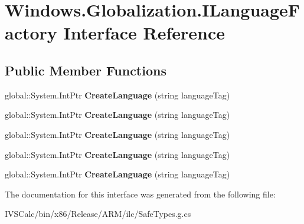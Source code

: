 \hypertarget{interface_windows_1_1_globalization_1_1_i_language_factory}{}\section{Windows.\+Globalization.\+I\+Language\+Factory Interface Reference}
\label{interface_windows_1_1_globalization_1_1_i_language_factory}
\subsection*{Public Member Functions}
\begin{DoxyCompactItemize}
\item 
\mbox{\label{interface_windows_1_1_globalization_1_1_i_language_factory_a6bab804d6e5bec1e8de8706976b6d11e}} 
global\+::\+System.\+Int\+Ptr {\bfseries Create\+Language} (string language\+Tag)
\item 
\mbox{\label{interface_windows_1_1_globalization_1_1_i_language_factory_a6bab804d6e5bec1e8de8706976b6d11e}} 
global\+::\+System.\+Int\+Ptr {\bfseries Create\+Language} (string language\+Tag)
\item 
\mbox{\label{interface_windows_1_1_globalization_1_1_i_language_factory_a6bab804d6e5bec1e8de8706976b6d11e}} 
global\+::\+System.\+Int\+Ptr {\bfseries Create\+Language} (string language\+Tag)
\item 
\mbox{\label{interface_windows_1_1_globalization_1_1_i_language_factory_a6bab804d6e5bec1e8de8706976b6d11e}} 
global\+::\+System.\+Int\+Ptr {\bfseries Create\+Language} (string language\+Tag)
\item 
\mbox{\label{interface_windows_1_1_globalization_1_1_i_language_factory_a6bab804d6e5bec1e8de8706976b6d11e}} 
global\+::\+System.\+Int\+Ptr {\bfseries Create\+Language} (string language\+Tag)
\end{DoxyCompactItemize}


The documentation for this interface was generated from the following file\+:\begin{DoxyCompactItemize}
\item 
I\+V\+S\+Calc/bin/x86/\+Release/\+A\+R\+M/ilc/Safe\+Types.\+g.\+cs\end{DoxyCompactItemize}
